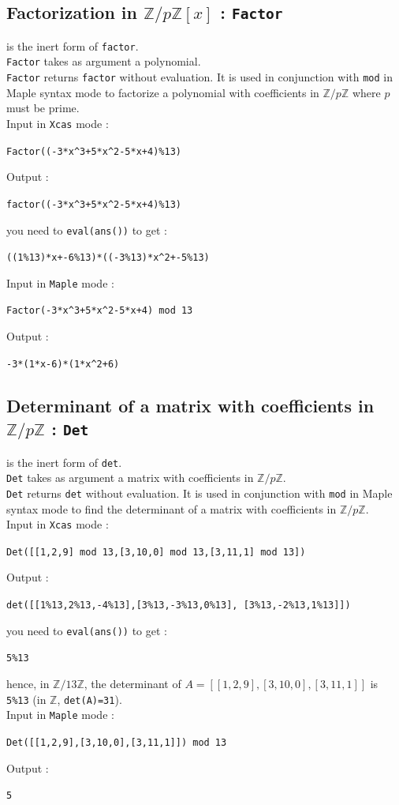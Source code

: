\documentclass[a4paper,11pt]{book}
\newcommand{\Z}{{\mathbb{Z}}}
\begin{document}
\subsection{Factorization in $\Z/p\Z[x]$ : {\tt Factor}}
 is the inert form of {\tt factor}.\\
{\tt Factor} takes as argument a polynomial.\\
{\tt Factor} returns {\tt factor} without evaluation. 
It is used in conjunction with {\tt mod} in Maple syntax mode to 
factorize a polynomial with coefficients in $\Z/p\Z$
where $p$ must be prime.\\
Input in {\tt Xcas} mode :
\begin{center}{\tt Factor((-3*x\verb|^|3+5*x\verb|^|2-5*x+4)\%13)}\end{center}
Output :
\begin{center}{\tt factor((-3*x\verb|^|3+5*x\verb|^|2-5*x+4)\%13)}\end{center}
you need to {\tt eval(ans())} to get :
\begin{center}{\tt ((1\%13)*x+-6\%13)*((-3\%13)*x\verb|^|2+-5\%13)}\end{center}
Input in {\tt Maple} mode :
\begin{center}{\tt Factor(-3*x\verb|^|3+5*x\verb|^|2-5*x+4) mod 13}\end{center}
Output :
\begin{center}{\tt -3*(1*x-6)*(1*x\verb|^|2+6)}\end{center}

\subsection{Determinant of a matrix with coefficients in $\Z/p\Z$ : {\tt Det}}
 is the inert form of {\tt det}.\\
{\tt Det} takes as argument a matrix with coefficients in $\Z/p\Z$.\\ 
{\tt Det} returns {\tt det} without evaluation. 
It is used in conjunction with {\tt mod} in Maple syntax mode to 
find the determinant of a matrix with coefficients in $\Z/p\Z$.\\
Input in {\tt Xcas} mode :
\begin{center}{\tt Det([[1,2,9] mod 13,[3,10,0] mod 13,[3,11,1] mod 13])}\end{center} 
Output :
\begin{center}{\tt det([[1\%13,2\%13,-4\%13],[3\%13,-3\%13,0\%13], [3\%13,-2\%13,1\%13]])}\end{center}
you need to {\tt eval(ans())} to get :
\begin{center}{\tt 5\%13}\end{center} 
hence, in  $\Z/13\Z$, the determinant of
$A=[[1, 2, 9],[3,10,0],[3,11,1]]$ is {\tt 5\%13} (in $\Z$, {\tt det(A)=31}).\\
Input in {\tt Maple} mode :
\begin{center}{\tt Det([[1,2,9],[3,10,0],[3,11,1]]) mod 13}\end{center}
Output :
\begin{center}{\tt 5}\end{center}
\end{document}
